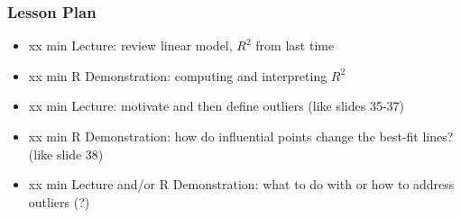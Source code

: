 \begin{frame}
    \frametitle{Lesson Plan}
    \begin{itemize}
        \item xx min Lecture: review linear model, $R^2$ from last time
        \item xx min R Demonstration: computing and interpreting $R^2$
        \item xx min Lecture: motivate and then define outliers (like slides 35-37)
        \item xx min R Demonstration: how do influential points change the best-fit lines? (like slide 38)
        \item xx min Lecture and/or R Demonstration: what to do with or how to address outliers (?)  %
    \end{itemize}
\end{frame}

